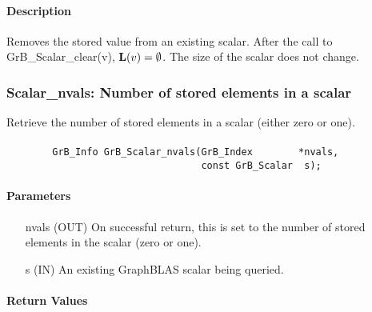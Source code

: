 \paragraph{Description}

Removes the stored value from an existing scalar. After the call to
{\sf GrB\_Scalar\_clear(v)}, 
$\mathbf{L}({v}) = \emptyset$. The size of the scalar does not change. 


\subsubsection{{\sf Scalar\_nvals}: Number of stored elements in a scalar}
\label{Sec:Scalar_nvals}

Retrieve the number of stored elements in a scalar (either zero or one).

\paragraph{\syntax}

\begin{verbatim}
        GrB_Info GrB_Scalar_nvals(GrB_Index        *nvals,
                                  const GrB_Scalar  s);
\end{verbatim}

\paragraph{Parameters}

\begin{itemize}[leftmargin=1.1in]
    \item[{\sf nvals}] ({\sf OUT}) On successful return, this is set to the number of 
                                   stored elements in the scalar (zero or one).
    \item[{\sf s}]     ({\sf IN})  An existing GraphBLAS scalar being queried.
\end{itemize}


\paragraph{Return Values}

